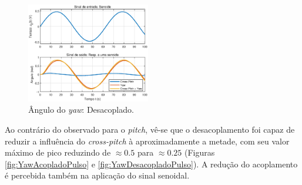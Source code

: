 \begin{figure}[H]
    \centering
    \includegraphics[width=0.48\textwidth]{figures/Desacoplamento/Yaw_Desacoplado_Senoide.eps}
    \caption{Ângulo do \textit{yaw}: Desacoplado.}
    \label{fig:YawDesacopladoSenoide}
\end{figure}

Ao contrário do observado para o \textit{pitch}, vê-se que o desacoplamento foi capaz de reduzir a influência do \textit{cross-pitch} à aproximadamente a metade, com seu valor máximo de pico reduzindo de $\approx 0.5$ para $\approx 0.25$ (Figuras \ref{fig:YawAcopladoPulso} e \ref{fig:YawDesacopladoPulso}). A redução do acoplamento é percebida também na aplicação do sinal senoidal.